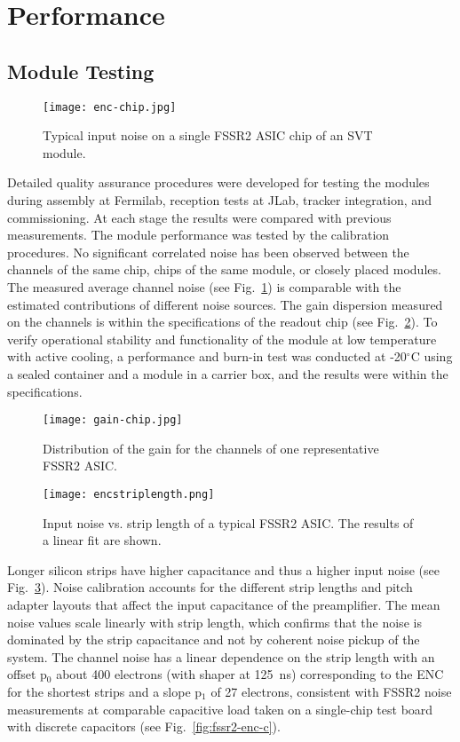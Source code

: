 \section{Performance}

\subsection{Module Testing}

\begin{figure}[hbt] 
\centering 
\texttt{[image: enc-chip.jpg]}
\caption{Typical input noise on a single FSSR2 ASIC chip of an SVT module.}
\label{fig:enc-chip}
\end{figure} 

Detailed quality assurance procedures were developed for testing the modules during assembly at Fermilab,
reception tests at JLab, tracker integration, and commissioning. At each stage the results were compared with
previous measurements. The module performance was tested by the calibration procedures. No significant
correlated noise has been observed between the channels of the same chip, chips of the same module, or closely
placed modules. The measured average channel noise (see Fig.~\ref{fig:enc-chip}) is comparable with the
estimated contributions of different noise sources. The gain dispersion measured on the channels is within the
specifications of the readout chip (see Fig.~\ref{fig:gain-chip}). To verify operational stability and functionality
of the module at low temperature with active cooling, a performance and burn-in test was conducted at
-20$^\circ$C using a sealed container and a module in a carrier box, and the results were within the specifications.

\begin{figure}[hbt] 
\centering 
\texttt{[image: gain-chip.jpg]}
\caption{Distribution of the gain for the channels of one representative FSSR2 ASIC.}
\label{fig:gain-chip}
\end{figure}

\begin{figure}[hbt] 
	\centering 
	\texttt{[image: encstriplength.png]}
	\caption{Input noise vs. strip length of a typical FSSR2 ASIC. The results of a linear fit are shown.}
	\label{fig:encstriplength}
\end{figure}

Longer silicon strips have higher capacitance and thus a higher input noise (see Fig.~\ref{fig:encstriplength}).
Noise calibration accounts for the different strip lengths and pitch adapter layouts that affect the input
capacitance of the preamplifier. The mean noise values scale linearly with strip length, which confirms that the
noise is dominated by the strip capacitance and not by coherent noise pickup of the system. The channel noise has
a linear dependence on the strip length with an offset p$_0$ about 400 electrons (with shaper at 125~ns)
corresponding to the ENC for the shortest strips and a slope p$_1$ of 27 electrons, consistent with FSSR2 noise
measurements at comparable capacitive load taken on a single-chip test board with discrete capacitors (see
Fig.~\ref{fig:fssr2-enc-c}).

